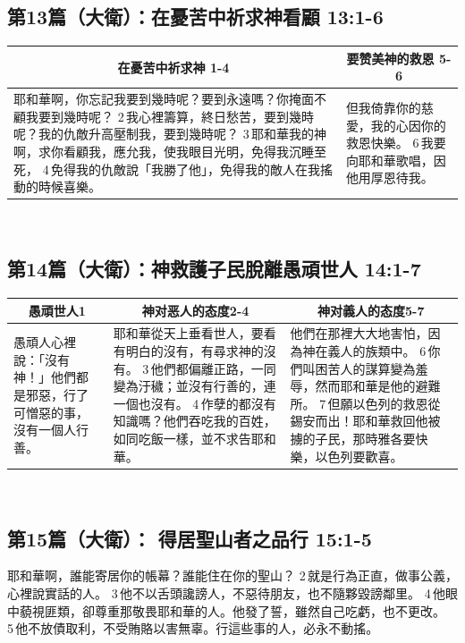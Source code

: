 \subsection{第13篇（大衛）：在憂苦中祈求神看顧 13:1-6}
\begin{table}[H]
\centering
\begin{tabular}{p{}|p{5.00cm}}\hline\hline
\multicolumn{1}{c|}{在憂苦中祈求神 1-4}&\multicolumn{1}{c}{要赞美神的救恩 5-6}\\\hline
耶和華啊，你忘記我要到幾時呢？要到永遠嗎？你掩面不顧我要到幾時呢？
2 我心裡籌算，終日愁苦，要到幾時呢？我的仇敵升高壓制我，要到幾時呢？
3 耶和華我的神啊，求你看顧我，應允我，使我眼目光明，免得我沉睡至死，
4 免得我的仇敵說「我勝了他」，免得我的敵人在我搖動的時候喜樂。
&但我倚靠你的慈愛，我的心因你的救恩快樂。
6 我要向耶和華歌唱，因他用厚恩待我。\\\hline
\end{tabular}
\end{table} 


\subsection{第14篇（大衛）：神救護子民脫離愚頑世人  14:1-7}
\begin{table}[H]
\centering
\begin{tabular}{p{}|p{7.00cm}|p{7.00cm}}\hline\hline
\multicolumn{1}{c|}{愚頑世人1}&\multicolumn{1}{c}{神对恶人的态度2-4}&\multicolumn{1}{c}{神对義人的态度5-7}\\\hline
愚頑人心裡說：「沒有神！」他們都是邪惡，行了可憎惡的事，沒有一個人行善。
&耶和華從天上垂看世人，要看有明白的沒有，有尋求神的沒有。
3 他們都偏離正路，一同變為汙穢；並沒有行善的，連一個也沒有。
4 作孽的都沒有知識嗎？他們吞吃我的百姓，如同吃飯一樣，並不求告耶和華。
&他們在那裡大大地害怕，因為神在義人的族類中。
6 你們叫困苦人的謀算變為羞辱，然而耶和華是他的避難所。
7 但願以色列的救恩從錫安而出！耶和華救回他被擄的子民，那時雅各要快樂，以色列要歡喜。\\\hline
\end{tabular}
\end{table} 


\subsection{第15篇（大衛）： 得居聖山者之品行 15:1-5}
耶和華啊，誰能寄居你的帳幕？誰能住在你的聖山？
2 就是行為正直，做事公義，心裡說實話的人。
3 他不以舌頭讒謗人，不惡待朋友，也不隨夥毀謗鄰里。
4 他眼中藐視匪類，卻尊重那敬畏耶和華的人。他發了誓，雖然自己吃虧，也不更改。
5 他不放債取利，不受賄賂以害無辜。行這些事的人，必永不動搖。

